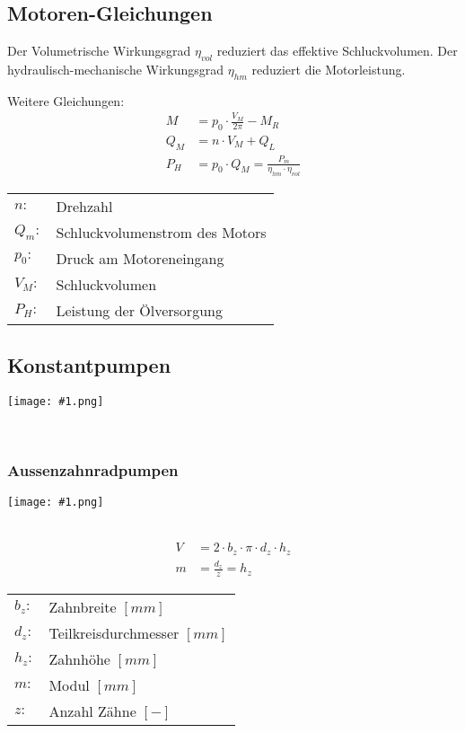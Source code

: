 \documentclass[landscape,a4paper,10pt]{article}
\newcommand{\graphiccol}[1]{
\noindent
\begin{minipage}{\columnwidth}
\centering
\texttt{[image: \#1.png]}
\end{minipage}
\medskip \\
}
\begin{document}
\begin{multicols*}{3}
\subsection{Motoren-Gleichungen}
Der Volumetrische Wirkungsgrad $\eta_{vol}$ reduziert das effektive Schluckvolumen. Der hydraulisch-mechanische Wirkungsgrad $\eta_{hm}$ reduziert die Motorleistung. 


Weitere Gleichungen:
\begin{align*}
M &= p_0 \cdot \frac{V_M}{2 \pi} - M_R \tag{Lastmoment} \\
Q_M &= n \cdot V_M + Q_L \tag{Volumenstrom} \\
P_H &= p_0 \cdot Q_M = \frac{P_m}{\eta_{hm} \cdot \eta_{vol}}
\end{align*}

\begin{tabular}{ll}
$n:$ & Drehzahl \\
$Q_m:$ & Schluckvolumenstrom des Motors\\
$p_0:$ & Druck am Motoreneingang \\
$V_M:$ & Schluckvolumen \\
$P_H:$ & Leistung der Ölversorgung \\
\end{tabular}



\subsection{Konstantpumpen}
\graphiccol{konstantpumpen}

\subsubsection{Aussenzahnradpumpen}
\graphiccol{aussenzahnradpumpe}
\begin{align*}
V &= 2 \cdot b_z \cdot \pi \cdot d_z \cdot h_z \\
m &= \frac{d_z}{z} = h_z
\end{align*}


\begin{tabular}{ll}
$b_z:$ & Zahnbreite $[mm]$\\
$d_z:$& Teilkreisdurchmesser $[mm]$\\
$h_z:$& Zahnhöhe $[mm]$\\
$m:$& Modul $[mm]$\\
$z:$& Anzahl Zähne $[-]$
\end{tabular} \\



\end{multicols*}
\end{document}
